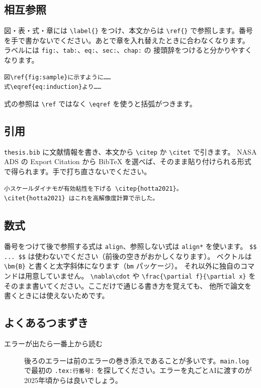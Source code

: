 \subsection{相互参照}

図・表・式・章には \verb|\label{}| をつけ、本文からは \verb|\ref{}| で参照します。番号を手で書かないでください。あとで章を入れ替えたときに合わなくなります。
ラベルには \verb|fig:|、\verb|tab:|、\verb|eq:|、\verb|sec:|、\verb|chap:| の
接頭辞をつけると分かりやすくなります。

\begin{verbatim}
図\ref{fig:sample}に示すように……
式\eqref{eq:induction}より……
\end{verbatim}

\noindent
式の参照は \verb|\ref| ではなく \verb|\eqref| を使うと括弧がつきます。

\subsection{引用}

\texttt{thesis.bib} に文献情報を書き、本文から \verb|\citep| か \verb|\citet| で引きます。
NASA ADS の \textsf{Export Citation} から \textsf{BibTeX} を選べば、そのまま貼り付けられる形式で得られます。手で打ち直さないでください。

\begin{verbatim}
小スケールダイナモが有効粘性を下げる \citep{hotta2021}。
\citet{hotta2021} はこれを高解像度計算で示した。
\end{verbatim}

\subsection{数式}

番号をつけて後で参照する式は \texttt{align}、参照しない式は \texttt{align*} を使います。
\verb|$$ ... $$| は使わないでください（前後の空きがおかしくなります）。
ベクトルは \verb|\bm{B}| と書くと太字斜体になります（\texttt{bm} パッケージ）。
それ以外に独自のコマンドは用意していません。
\verb|\nabla\cdot| や \verb|\frac{\partial f}{\partial x}| を
そのまま書いてください。ここだけで通じる書き方を覚えても、
他所で論文を書くときには使えないためです。

\subsection{よくあるつまずき}

\begin{description}
  \item[エラーが出たら一番上から読む] 後ろのエラーは前のエラーの巻き添えであることが多いです。\texttt{main.log} で最初の \verb|.tex:行番号:| を探してください。エラーを丸ごとAIに渡すのが2025年頃からは良いでしょう。
\end{description}

